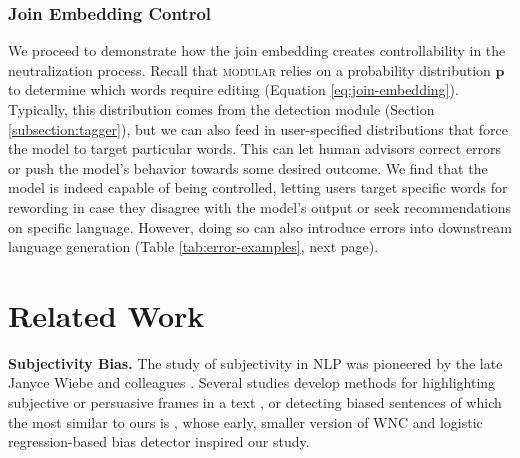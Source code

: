\subsubsection{Join Embedding Control}

We proceed to demonstrate how the join embedding creates controllability in the neutralization process. Recall that \textsc{modular} relies on a probability distribution $\mathbf{p}$ to determine which words require editing (Equation \ref{eq:join-embedding}). Typically, this distribution comes from the detection module (Section \ref{subsection:tagger}), but we can also feed in user-specified distributions that force the model to target particular words. This can let human advisors correct errors or push the model's behavior towards some desired outcome. We find that the model is indeed capable of being controlled, letting users target specific words for rewording in case they disagree with the model's output or seek recommendations on specific language. However, doing so can also introduce errors into downstream language generation (Table \ref{tab:error-examples}, next page). 

\section{Related Work}

\textbf{Subjectivity Bias.} 
The study of subjectivity in NLP was pioneered by the late Janyce Wiebe and colleagues \cite{bruce1999recognizing,hatzivassiloglou2000effects}.
Several studies develop methods for highlighting subjective or persuasive frames in a text \cite{rashkin2017truth,tsur2015frame}, 
or detecting biased sentences
\cite{hube2018detecting,morstatter2018identifying,yang2017identifying,hube2019neural}
of which the most similar to ours is \citet{recasens2013linguistic}, whose early, smaller version of WNC and logistic regression-based bias detector inspired our study.




